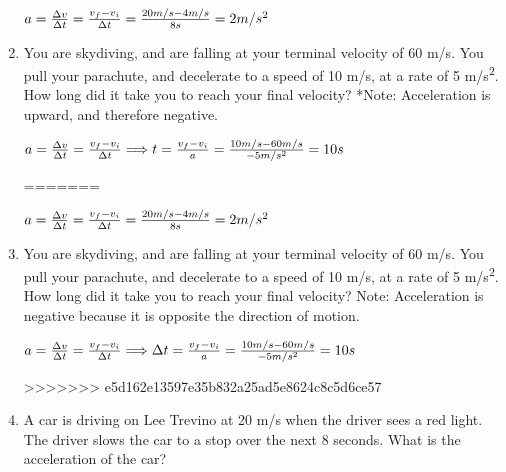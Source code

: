 \documentclass[letterpaper, 12pt]{article}
\begin{document}
\begin{enumerate}
	
	
	\color{red}
	\begin{center} $ a = \frac{\Delta v}{\Delta t } = \frac{v_f - v_i}{\Delta t} =  \frac{20 m/s - 4 m/s}{8s} = 2 m/s^2
		\vspace{0.15in} $
	\end{center}	
	\color{black}
	

\item You are skydiving, and are falling at your terminal velocity of 60 m/s.  You pull your parachute, and decelerate to a speed of 10 m/s, at a rate of 5 m/s\textsuperscript{2}.  How long did it take you to reach your final velocity? \color{red} *Note: Acceleration is upward, and therefore negative.



\begin{center} $ a = \frac{\Delta v}{\Delta t } = \frac{v_f - v_i}{\Delta t} \Longrightarrow t = \frac{v_f-v_i}{a} = \frac{10m/s-60m/s}{-5m/s^2} = 10s
	\vspace{0.15in} $
\end{center}	
\color{black}


=======
	
	\color{red}
	\begin{center} $ a = \frac{\Delta v}{\Delta t } = \frac{v_f - v_i}{\Delta t} = \frac{20m/s-4m/s}{8s} = 2 m/s^2
		\vspace{0.15in} $
	\end{center}
	\color{black}

\item You are skydiving, and are falling at your terminal velocity of 60 m/s.  You pull your parachute, and decelerate to a speed of 10 m/s, at a rate of 5 m/s\textsuperscript{2}.  How long did it take you to reach your final velocity? 	\color{red} Note: Acceleration is negative because it is opposite the direction of motion. 
		

	\begin{center} $ a = \frac{\Delta v}{\Delta t } = \frac{v_f - v_i}{\Delta t} \Longrightarrow \Delta t = \frac{v_f - v_i}{a} = \frac{10m/s-60m/s}{-5m/s^2} = 10s
		\vspace{0.15in} $
	\end{center}
	\color{black}
>>>>>>> e5d162e13597e35b832a25ad5e8624c8c5d6ce57


\item A car is driving on Lee Trevino at 20 m/s when the driver sees a red light.  The driver slows the car to a stop over the next 8 seconds.  What is the acceleration of the car?


\end{enumerate}
\end{document}
